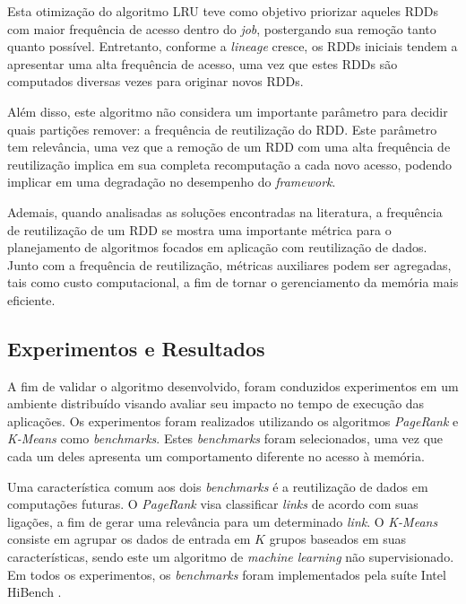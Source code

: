 Esta otimização do algoritmo LRU teve como objetivo priorizar aqueles RDDs com maior frequência de acesso dentro do \textit{job}, postergando sua remoção tanto quanto possível. Entretanto, conforme a \textit{lineage} cresce, os RDDs iniciais tendem a apresentar uma alta frequência de acesso, uma vez que estes RDDs são computados diversas vezes para originar novos RDDs. 

Além disso, este algoritmo não considera um importante parâmetro para decidir quais partições remover: a frequência de reutilização do RDD. Este parâmetro tem relevância, uma vez que a remoção de um RDD com uma alta frequência de reutilização implica em sua completa recomputação a cada novo acesso, podendo implicar em uma degradação no desempenho do \textit{framework}. 

Ademais, quando analisadas as soluções encontradas na literatura, a frequência de reutilização de um RDD se mostra uma importante métrica para o planejamento de algoritmos focados em aplicação com reutilização de dados. Junto com a frequência de reutilização, métricas auxiliares podem ser agregadas, tais como custo computacional, a fim de tornar o gerenciamento da memória mais eficiente.

\subsection{Experimentos e Resultados}
A fim de validar o algoritmo desenvolvido, foram conduzidos experimentos em um ambiente distribuído visando avaliar seu impacto no tempo de execução das aplicações. Os experimentos foram realizados utilizando os algoritmos  \textit{PageRank} e \textit{K-Means} como \textit{benchmarks}. Estes \textit{benchmarks} foram selecionados, uma vez que cada um deles apresenta um comportamento diferente no acesso à memória. 

Uma característica comum aos dois \textit{benchmarks} é a reutilização de dados em computações futuras. O \textit{PageRank} visa classificar \textit{links} de acordo com suas ligações, a fim de gerar uma relevância para um determinado \textit{link}. O \textit{K-Means} consiste em agrupar os dados de entrada em $K$ grupos baseados em suas características, sendo este um algoritmo de \textit{machine learning} não supervisionado. Em todos os experimentos, os \textit{benchmarks} foram implementados pela suíte Intel HiBench \cite{huang2010hibench}.


